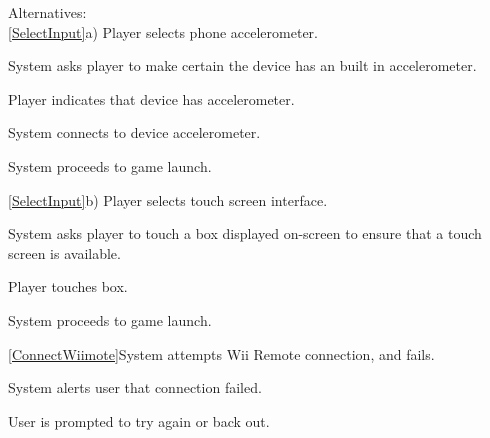 \documentclass[12pt]{article}
\newenvironment{enumerate*}%
  {\begin{enumerate}%
  	\setlength{\parsep}{0pt}
    \setlength{\itemsep}{0pt}%
    \setlength{\parskip}{0pt}}%
  {\end{enumerate}}
\begin{document}
Alternatives:\\
\ref{SelectInput}a) Player selects phone accelerometer.  
\begin{enumerate*}
\item System asks player to make certain the device has an built in 
  accelerometer.
\item Player indicates that device has accelerometer.
\item System connects to device accelerometer.
\item System proceeds to game launch.
\end{enumerate*}
\ref{SelectInput}b) Player selects touch screen interface.
\begin{enumerate*}
\item System asks player to touch a box displayed on-screen to ensure 
  that a touch screen is available.
\item Player touches box.
\item System proceeds to game launch.
\end{enumerate*}
\ref{ConnectWiimote}System attempts Wii Remote connection, and fails.
\begin{enumerate*}
\item System alerts user that connection failed.
\item User is prompted to try again or back out.
\end{enumerate*}
\end{document}
